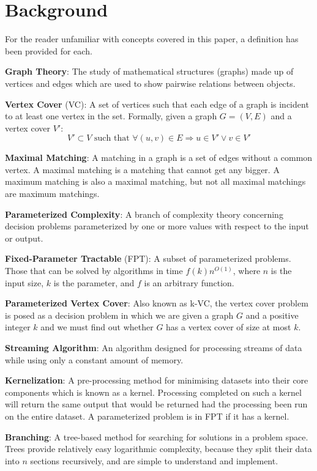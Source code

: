 \section{Background}

For the reader unfamiliar with concepts covered in this paper, a definition has
been provided for each.

\textbf{Graph Theory}: The study of mathematical structures (graphs) made up of
vertices and edges which are used to show pairwise relations between objects.

\textbf{Vertex Cover} (VC): A set of vertices such that each edge of a graph is
incident to at least one vertex in the set. Formally, given a graph \(G = (V,
E)\) and a vertex cover \(V'\):
\[
    V' \subset V \text{ such that } \forall (u, v) \in E \Rightarrow u \in V' \vee v \in V'
\]

\textbf{Maximal Matching}: A matching in a graph is a set of edges without a
common vertex. A maximal matching is a matching that cannot get any bigger. A
maximum matching is also a maximal matching, but not all maximal matchings are
maximum matchings.

\textbf{Parameterized Complexity}: A branch of complexity theory concerning
decision problems parameterized by one or more values with respect to the input
or output.

\textbf{Fixed-Parameter Tractable} (FPT): A subset of parameterized problems.
Those that can be solved by algorithms in time \(f(k)n^{O(1)}\), where \(n\) is
the input size, \(k\) is the parameter, and \(f\) is an arbitrary function.

\textbf{Parameterized Vertex Cover}: Also known as k-VC, the vertex cover
problem is posed as a decision problem in which we are given a graph \(G\) and
a positive integer \(k\) and we must find out whether \(G\) has a vertex cover
of size at most \(k\).

\textbf{Streaming Algorithm}: An algorithm designed for processing streams of
data while using only a constant amount of memory.

\textbf{Kernelization}: A pre-processing method for minimising datasets into
their core components which is known as a kernel. Processing completed on such
a kernel will return the same output that would be returned had the processing
been run on the entire dataset. A parameterized problem is in FPT if it has a
kernel.

\textbf{Branching}: A tree-based method for searching for solutions in a
problem space. Trees provide relatively easy logarithmic complexity, because
they split their data into \(n\) sections recursively, and are simple to
understand and implement.
